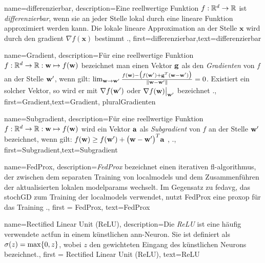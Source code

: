 {{{{{	
	{name={differenzierbar},
		description={Eine reellwertige Funktion $f: \mathbb{R}^{d} \rightarrow \mathbb{R}$ 
			ist \textit{differenzierbar}, wenn sie an jeder Stelle lokal durch eine lineare Funktion 
			approximiert werden kann. Die lokale lineare Approximation an der Stelle $\mathbf{x}$ 
			wird durch den \gls{gradient} $\nabla f ( \mathbf{x})$ bestimmt 
			\cite{RudinBookPrinciplesMatheAnalysis}.},
		first={differenzierbar},text={differenzierbar} 
	}
	
	{name={Gradient},
		description={Für eine reellwertige Funktion $f: \mathbb{R}^{d} \rightarrow \mathbb{R}: {\bf w} \mapsto f({\bf w})$ 
			bezeichnet man einen Vektor ${\bf g}$ als den \emph{Gradienten} von $f$ an der Stelle ${\bf w}'$, 
			wenn gilt: $\lim_{{\bf w} \rightarrow {\bf w}'} \frac{f({\bf w}) - \big(f({\bf w}')+ {\bf g}^{T} ({\bf w}- {\bf w}') \big) }{\| {\bf w}-{\bf w}'\|}=0$. 
			Existiert ein solcher Vektor, so wird er mit $\nabla f({\bf w}')$ oder $\nabla f({\bf w})\big|_{{\bf w}'}$ bezeichnet 
			\cite{RudinBookPrinciplesMatheAnalysis}.},
		first={Gradient},text={Gradient}, plural{Gradienten} 
	}

{name={Subgradient},
	description={Für eine reellwertige Funktion $f: \mathbb{R}^{d} \rightarrow \mathbb{R}: {\bf w} \mapsto f({\bf w})$ 
		wird ein Vektor ${\bf a}$ als \emph{Subgradient} von $f$ an der Stelle ${\bf w}'$ bezeichnet, 
		wenn gilt: $f({\bf w}) \geq f({\bf w}') + \big({\bf w} - {\bf w}' \big)^{T} {\bf a}$ 
		\cite{BertCvxAnalOpt}, \cite{BertsekasNonLinProgr}.},
	first={Subgradient},text={Subgradient} 
}

{name={FedProx},
	description={\textit{FedProx} bezeichnet einen iterativen \gls{fl}-\gls{algorithmus}, 
		der zwischen dem separaten Training von \gls{localmodel}s und dem Zusammenführen der aktualisierten lokalen \gls{modelparams} wechselt. 
		Im Gegensatz zu \gls{fedavg}, das \gls{stochGD} zum Training der \gls{localmodel}s verwendet, 
		nutzt FedProx eine \gls{proxop} für das Training \cite{FedProx2020}.},
	first = {FedProx}, text={FedProx} 
}

{name={Rectified Linear Unit (ReLU)},
	description={Die \textit{ReLU} ist eine häufig verwendete \gls{actfun} 
		in einem künstlichen \gls{ann}-Neuron. Sie ist definiert als 
		$\sigma(z) = \max\{0,z\}$, wobei $z$ den gewichteten Eingang des künstlichen Neurons bezeichnet.},
	first = {Rectified Linear Unit (ReLU)}, text={ReLU} 
}

}}}}}
